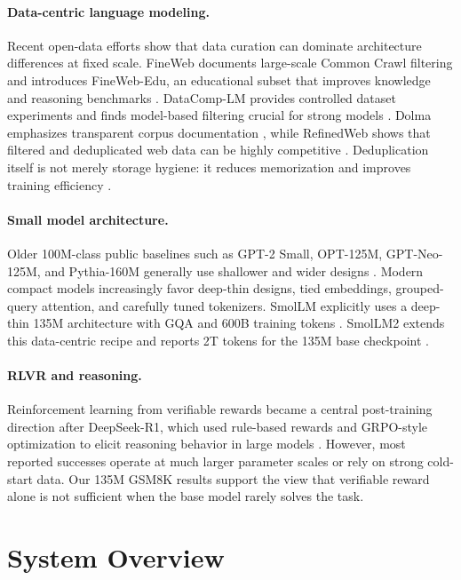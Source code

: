 \documentclass[11pt]{article}
\begin{document}
\paragraph{Data-centric language modeling.}
Recent open-data efforts show that data curation can dominate architecture differences at fixed scale. FineWeb documents large-scale Common Crawl filtering and introduces FineWeb-Edu, an educational subset that improves knowledge and reasoning benchmarks \citep{penedo2024fineweb}. DataComp-LM provides controlled dataset experiments and finds model-based filtering crucial for strong models \citep{li2024datacomplm}. Dolma emphasizes transparent corpus documentation \citep{soldaini2024dolma}, while RefinedWeb shows that filtered and deduplicated web data can be highly competitive \citep{penedo2023refinedweb}. Deduplication itself is not merely storage hygiene: it reduces memorization and improves training efficiency \citep{lee2021deduplicating}.

\paragraph{Small model architecture.}
Older 100M-class public baselines such as GPT-2 Small, OPT-125M, GPT-Neo-125M, and Pythia-160M generally use shallower and wider designs \citep{radford2019gpt2,zhang2022opt,biderman2023pythia}. Modern compact models increasingly favor deep-thin designs, tied embeddings, grouped-query attention, and carefully tuned tokenizers. SmolLM explicitly uses a deep-thin 135M architecture with GQA and 600B training tokens \citep{smollm_blog}. SmolLM2 extends this data-centric recipe and reports 2T tokens for the 135M base checkpoint \citep{smollm2_card,allal2025smollm2}.

\paragraph{RLVR and reasoning.}
Reinforcement learning from verifiable rewards became a central post-training direction after DeepSeek-R1, which used rule-based rewards and GRPO-style optimization to elicit reasoning behavior in large models \citep{deepseek2025r1}. However, most reported successes operate at much larger parameter scales or rely on strong cold-start data. Our 135M GSM8K results support the view that verifiable reward alone is not sufficient when the base model rarely solves the task.

\section{System Overview}
\end{document}
